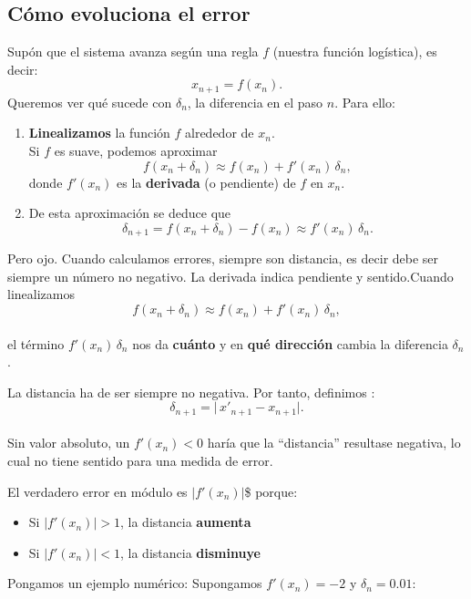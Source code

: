 \documentclass[
  10pt,
  a4paper,
  DIV=11,
  numbers=noendperiod,
  open=any]{scrreprt}
\providecommand{\tightlist}{%
  \setlength{\itemsep}{0pt}\setlength{\parskip}{0pt}}
\numberwithin{equation}{chapter}
\numberwithin{equation}{chapter}
\renewcommand{\[}{\begin{equation}}
\renewcommand{\]}{\end{equation}}
\begin{document}
\subsection{Cómo evoluciona el error}\label{cuxf3mo-evoluciona-el-error}

Supón que el sistema avanza según una regla \(f\) (nuestra función
logística), es decir: \[
x_{n+1} = f(x_n).
\] Queremos ver qué sucede con \(\delta_n\), la diferencia en el paso
\(n\). Para ello:

\begin{enumerate}
\def\labelenumi{\arabic{enumi}.}
\item
  \textbf{Linealizamos} la función \(f\) alrededor de \(x_n\).\\
  Si \(f\) es suave, podemos aproximar \[
    f(x_n + \delta_n)
    \approx f(x_n)
         + f'(x_n)\,\delta_n,
  \] donde \(f'(x_n)\) es la \textbf{derivada} (o pendiente) de \(f\) en
  \(x_n\).
\item
  De esta aproximación se deduce que \[
    \delta_{n+1} 
    = f(x_n + \delta_n) - f(x_n)
    \approx f'(x_n)\,\delta_n.
  \]
\end{enumerate}

Pero ojo. Cuando calculamos errores, siempre son distancia, es decir
debe ser siempre un número no negativo. La derivada indica pendiente y
sentido.Cuando linealizamos\\
\[
   f(x_n + \delta_n)\approx f(x_n) + f'(x_n)\,\delta_n,
   \]\\
el término \(f'(x_n)\,\delta_n\) nos da \textbf{cuánto} y en \textbf{qué
dirección} cambia la diferencia \(\delta_n\).

La distancia ha de ser siempre no negativa. Por tanto, definimos : \[
   \delta_{n+1} = \bigl|\,x'_{n+1} - x_{n+1}\bigr|.
   \]\\
Sin valor absoluto, un \(f'(x_n)<0\) haría que la ``distancia''
resultase negativa, lo cual no tiene sentido para una medida de error.

El verdadero error en módulo es \(\bigl|f'(x_n)\bigr|\)\$ porque:

\begin{itemize}
\tightlist
\item
  Si \(\lvert f'(x_n)\rvert>1\), la distancia \textbf{aumenta}\\
\item
  Si \(\lvert f'(x_n)\rvert<1\), la distancia \textbf{disminuye}
\end{itemize}

Pongamos un ejemplo numérico: Supongamos \(f'(x_n)=-2\) y
\(\delta_n=0.01\):
\end{document}
